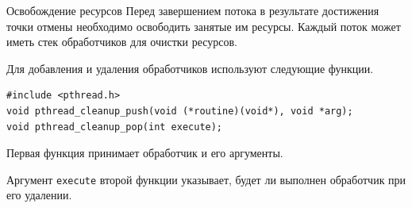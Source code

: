 \documentclass{beamer}
\begin{document}
\begin{frame}[fragile]{Освобождение ресурсов}
    Перед завершением потока в результате достижения точки отмены необходимо освободить занятые им ресурсы. Каждый поток может иметь стек обработчиков для очистки ресурсов.
    
    Для добавления и удаления обработчиков используют следующие функции.
    \begin{verbatim}
#include <pthread.h>
void pthread_cleanup_push(void (*routine)(void*), void *arg);
void pthread_cleanup_pop(int execute);
    \end{verbatim}
    
    Первая функция принимает обработчик и его аргументы. 
    
    Аргумент \texttt{execute} второй функции указывает, будет ли выполнен обработчик при его удалении.
\end{frame}
\end{document}
